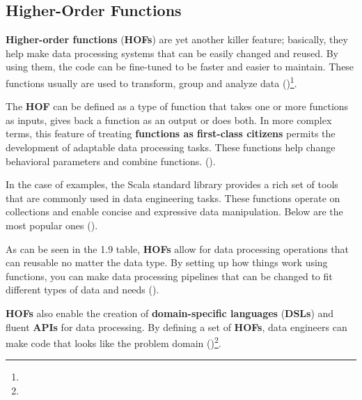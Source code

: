 

\subsection{Higher-Order Functions}

\textbf{Higher-order functions} (\textbf{HOFs}) are yet another killer feature; basically, they help make data processing systems that can be easily changed and reused. By using them, the code can be fine-tuned to be faster and easier to maintain. These functions usually are used to transform, group and analyze data (\cite{michael.etal_2023})\footnote[11]{}.

The \textbf{HOF} can be defined as a type of function that takes one or more functions as inputs, gives back a function as an output or does both. In more complex terms, this feature of treating \textbf{functions as first-class citizens} permits the development of adaptable data processing tasks. These functions help change behavioral parameters and combine functions. (\cite{michael.etal_2023})\footnotemark[11].

In the case of examples, the Scala standard library provides a rich set of tools that are commonly used in data engineering tasks. These functions operate on collections and enable concise and expressive data manipulation. Below are the most popular ones (\cite{michael.etal_2023})\footnotemark[11].









As can be seen in the 1.9 table, \textbf{HOFs} allow for data processing operations that can reusable no matter the data type. By setting up how things work using functions, you can make data processing pipelines that can be changed to fit different types of data and needs (\cite{michael.etal_2023})\footnotemark[11].

\textbf{HOFs} also enable the creation of \textbf{domain-specific languages} (\textbf{DSLs}) and fluent \textbf{APIs} for data processing. By defining a set of \textbf{HOFs}, data engineers can make code that looks like the problem domain (\cite{michael.etal_2023})\footnote[11]{}.





